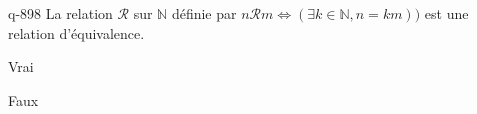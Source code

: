 \begin{truefalse}{q-898}
La relation $\mathcal R$ sur $\mathbb N$ définie par $n\mathcal R m \iff (\exists k\in\mathbb N,n=km))$ est une relation d'équivalence.
\item Vrai
\item* Faux
\end{truefalse}

